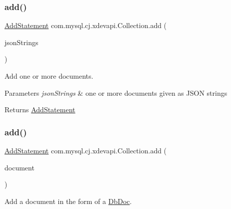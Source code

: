 \subsubsection{\texorpdfstring{add()}{add()}\hspace{0.1cm}{\footnotesize\ttfamily [2/4]}}
{\footnotesize\ttfamily \mbox{\hyperlink{interfacecom_1_1mysql_1_1cj_1_1xdevapi_1_1_add_statement}{Add\+Statement}} com.\+mysql.\+cj.\+xdevapi.\+Collection.\+add (\begin{DoxyParamCaption}\item[{String...}]{json\+Strings }\end{DoxyParamCaption})}

Add one or more documents.


\begin{DoxyParams}{Parameters}
{\em json\+Strings} & one or more documents given as J\+S\+ON strings \\
\hline
\end{DoxyParams}
\begin{DoxyReturn}{Returns}
\mbox{\hyperlink{interfacecom_1_1mysql_1_1cj_1_1xdevapi_1_1_add_statement}{Add\+Statement}} 
\end{DoxyReturn}
\mbox{\label{interfacecom_1_1mysql_1_1cj_1_1xdevapi_1_1_collection_a3dd00ea68a8c58d35090215f2371765f}} 
\subsubsection{\texorpdfstring{add()}{add()}\hspace{0.1cm}{\footnotesize\ttfamily [3/4]}}
{\footnotesize\ttfamily \mbox{\hyperlink{interfacecom_1_1mysql_1_1cj_1_1xdevapi_1_1_add_statement}{Add\+Statement}} com.\+mysql.\+cj.\+xdevapi.\+Collection.\+add (\begin{DoxyParamCaption}\item[{\mbox{\hyperlink{interfacecom_1_1mysql_1_1cj_1_1xdevapi_1_1_db_doc}{Db\+Doc}}}]{document }\end{DoxyParamCaption})}

Add a document in the form of a \mbox{\hyperlink{interfacecom_1_1mysql_1_1cj_1_1xdevapi_1_1_db_doc}{Db\+Doc}}.


